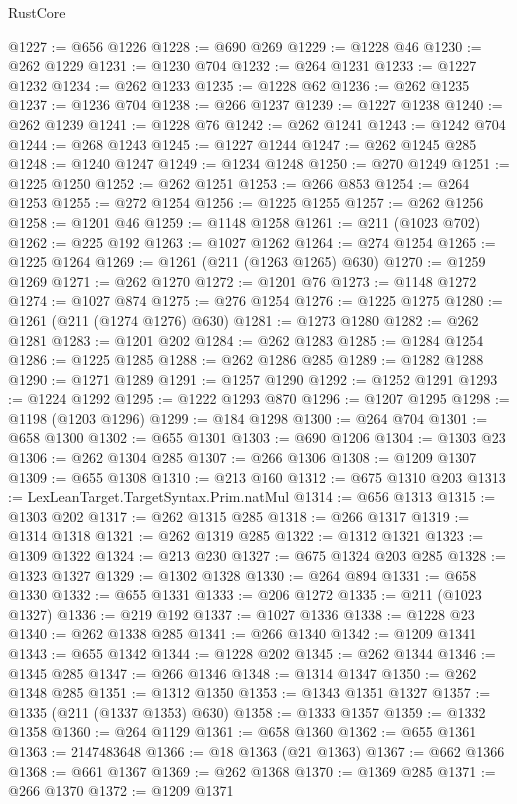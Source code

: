 \begin{lexlean}{RustCore}
\begin{coremodule}
@1227 := @656 @1226
@1228 := @690 @269
@1229 := @1228 @46
@1230 := @262 @1229
@1231 := @1230 @704
@1232 := @264 @1231
@1233 := @1227 @1232
@1234 := @262 @1233
@1235 := @1228 @62
@1236 := @262 @1235
@1237 := @1236 @704
@1238 := @266 @1237
@1239 := @1227 @1238
@1240 := @262 @1239
@1241 := @1228 @76
@1242 := @262 @1241
@1243 := @1242 @704
@1244 := @268 @1243
@1245 := @1227 @1244
@1247 := @262 @1245 @285
@1248 := @1240 @1247
@1249 := @1234 @1248
@1250 := @270 @1249
@1251 := @1225 @1250
@1252 := @262 @1251
@1253 := @266 @853
@1254 := @264 @1253
@1255 := @272 @1254
@1256 := @1225 @1255
@1257 := @262 @1256
@1258 := @1201 @46
@1259 := @1148 @1258
@1261 := @211 (@1023 @702)
@1262 := @225 @192
@1263 := @1027 @1262
@1264 := @274 @1254
@1265 := @1225 @1264
@1269 := @1261 (@211 (@1263 @1265) @630)
@1270 := @1259 @1269
@1271 := @262 @1270
@1272 := @1201 @76
@1273 := @1148 @1272
@1274 := @1027 @874
@1275 := @276 @1254
@1276 := @1225 @1275
@1280 := @1261 (@211 (@1274 @1276) @630)
@1281 := @1273 @1280
@1282 := @262 @1281
@1283 := @1201 @202
@1284 := @262 @1283
@1285 := @1284 @1254
@1286 := @1225 @1285
@1288 := @262 @1286 @285
@1289 := @1282 @1288
@1290 := @1271 @1289
@1291 := @1257 @1290
@1292 := @1252 @1291
@1293 := @1224 @1292
@1295 := @1222 @1293 @870
@1296 := @1207 @1295
@1298 := @1198 (@1203 @1296)
@1299 := @184 @1298
@1300 := @264 @704
@1301 := @658 @1300
@1302 := @655 @1301
@1303 := @690 @1206
@1304 := @1303 @23
@1306 := @262 @1304 @285
@1307 := @266 @1306
@1308 := @1209 @1307
@1309 := @655 @1308
@1310 := @213 @160
@1312 := @675 @1310 @203
@1313 := LexLeanTarget.TargetSyntax.Prim.natMul
@1314 := @656 @1313
@1315 := @1303 @202
@1317 := @262 @1315 @285
@1318 := @266 @1317
@1319 := @1314 @1318
@1321 := @262 @1319 @285
@1322 := @1312 @1321
@1323 := @1309 @1322
@1324 := @213 @230
@1327 := @675 @1324 @203 @285
@1328 := @1323 @1327
@1329 := @1302 @1328
@1330 := @264 @894
@1331 := @658 @1330
@1332 := @655 @1331
@1333 := @206 @1272
@1335 := @211 (@1023 @1327)
@1336 := @219 @192
@1337 := @1027 @1336
@1338 := @1228 @23
@1340 := @262 @1338 @285
@1341 := @266 @1340
@1342 := @1209 @1341
@1343 := @655 @1342
@1344 := @1228 @202
@1345 := @262 @1344
@1346 := @1345 @285
@1347 := @266 @1346
@1348 := @1314 @1347
@1350 := @262 @1348 @285
@1351 := @1312 @1350
@1353 := @1343 @1351 @1327
@1357 := @1335 (@211 (@1337 @1353) @630)
@1358 := @1333 @1357
@1359 := @1332 @1358
@1360 := @264 @1129
@1361 := @658 @1360
@1362 := @655 @1361
@1363 := 2147483648
@1366 := @18 @1363 (@21 @1363)
@1367 := @662 @1366
@1368 := @661 @1367
@1369 := @262 @1368
@1370 := @1369 @285
@1371 := @266 @1370
@1372 := @1209 @1371

\end{coremodule}
\end{lexlean}
